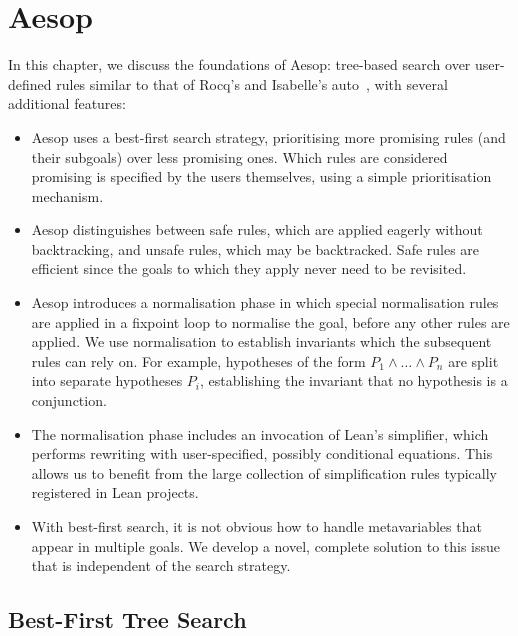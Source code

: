 \newcommand{\Theorema}{TH$∃$OREM$∀$}

\providecommand*{\quarternote}{%
  \begingroup
    \fontencoding{U}%
    \fontfamily{wasy}%
    \selectfont
    \symbol{12}%
  \endgroup
}

\chapter{Aesop}%
\label{chap:aesop}

In this chapter, we discuss the foundations of Aesop: tree-based search over user-defined rules similar to that of Rocq's and Isabelle's auto~\cite{IsabelleAuto}, with several additional features:
\begin{itemize}
  \item
    Aesop uses a best-first search strategy, prioritising more promising rules (and their subgoals) over less promising ones.
    Which rules are considered promising is specified by the users themselves, using a simple prioritisation mechanism.
  \item
    Aesop distinguishes between safe rules, which are applied eagerly without backtracking, and unsafe rules, which may be backtracked.
    Safe rules are efficient since the goals to which they apply never need to be revisited.
  \item
    Aesop introduces a normalisation phase in which special normalisation rules are applied in a fixpoint loop to normalise the goal, before any other rules are applied.
    We use normalisation to establish invariants which the subsequent rules can rely on.
    For example, hypotheses of the form $P_{1} ∧ \dots ∧ P_{n}$ are split into separate hypotheses $P_{i}$, establishing the invariant that no hypothesis is a conjunction.
  \item
    The normalisation phase includes an invocation of Lean's simplifier, which performs rewriting with user-specified, possibly conditional equations.
    This allows us to benefit from the large collection of simplification rules typically registered in Lean projects.
  \item
    With best-first search, it is not obvious how to handle metavariables that appear in multiple goals.
    We develop a novel, complete solution to this issue that is independent of the search strategy.
\end{itemize}

\section{Best-First Tree Search}%
\label{sec:aesop:abstract-framework}

